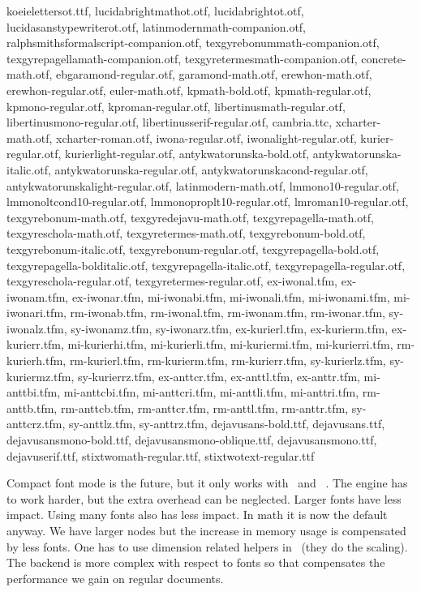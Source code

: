 \switchtobodyfont[tt,8pt]
koeielettersot.ttf, lucidabrightmathot.otf, lucidabrightot.otf,
lucidasanstypewriterot.otf, latinmodernmath-companion.otf,
ralphsmithsformalscript-companion.otf, texgyrebonummath-companion.otf,
texgyrepagellamath-companion.otf, texgyretermesmath-companion.otf,
concrete-math.otf, ebgaramond-regular.otf, garamond-math.otf, erewhon-math.otf,
erewhon-regular.otf, euler-math.otf, kpmath-bold.otf, kpmath-regular.otf,
kpmono-regular.otf, kproman-regular.otf, libertinusmath-regular.otf,
libertinusmono-regular.otf, libertinusserif-regular.otf, cambria.ttc,
xcharter-math.otf, xcharter-roman.otf, iwona-regular.otf, iwonalight-regular.otf,
kurier-regular.otf, kurierlight-regular.otf, antykwatorunska-bold.otf,
antykwatorunska-italic.otf, antykwatorunska-regular.otf,
antykwatorunskacond-regular.otf, antykwatorunskalight-regular.otf,
latinmodern-math.otf, lmmono10-regular.otf, lmmonoltcond10-regular.otf,
lmmonoproplt10-regular.otf, lmroman10-regular.otf, texgyrebonum-math.otf,
texgyredejavu-math.otf, texgyrepagella-math.otf, texgyreschola-math.otf,
texgyretermes-math.otf, texgyrebonum-bold.otf, texgyrebonum-italic.otf,
texgyrebonum-regular.otf, texgyrepagella-bold.otf, texgyrepagella-bolditalic.otf,
texgyrepagella-italic.otf, texgyrepagella-regular.otf, texgyreschola-regular.otf,
texgyretermes-regular.otf, ex-iwonal.tfm, ex-iwonam.tfm, ex-iwonar.tfm,
mi-iwonabi.tfm, mi-iwonali.tfm, mi-iwonami.tfm, mi-iwonari.tfm, rm-iwonab.tfm,
rm-iwonal.tfm, rm-iwonam.tfm, rm-iwonar.tfm, sy-iwonalz.tfm, sy-iwonamz.tfm,
sy-iwonarz.tfm, ex-kurierl.tfm, ex-kurierm.tfm, ex-kurierr.tfm, mi-kurierhi.tfm,
mi-kurierli.tfm, mi-kuriermi.tfm, mi-kurierri.tfm, rm-kurierh.tfm,
rm-kurierl.tfm, rm-kurierm.tfm, rm-kurierr.tfm, sy-kurierlz.tfm, sy-kuriermz.tfm,
sy-kurierrz.tfm, ex-anttcr.tfm, ex-anttl.tfm, ex-anttr.tfm, mi-anttbi.tfm,
mi-anttcbi.tfm, mi-anttcri.tfm, mi-anttli.tfm, mi-anttri.tfm, rm-anttb.tfm,
rm-anttcb.tfm, rm-anttcr.tfm, rm-anttl.tfm, rm-anttr.tfm, sy-anttcrz.tfm,
sy-anttlz.tfm, sy-anttrz.tfm, dejavusans-bold.ttf, dejavusans.ttf,
dejavusansmono-bold.ttf, dejavusansmono-oblique.ttf, dejavusansmono.ttf,
dejavuserif.ttf, stixtwomath-regular.ttf, stixtwotext-regular.ttf \stopalign

\stoptitle

\starttitle[title=Summary]

\startitemize
    \startitem
        Compact font mode is the future, but it only works with \LUAMETATEX\ and
        \CONTEXT\ \LMTX.
    \stopitem
    \startitem
        The engine has to work harder, but the extra overhead can be neglected.
    \stopitem
    \startitem
        Larger fonts have less impact.
    \stopitem
    \startitem
        Using many fonts also has less impact.
    \stopitem
    \startitem
        In math it is now the default anyway.
    \stopitem
    \startitem
        We have larger nodes but the increase in memory usage is compensated by less fonts.
    \stopitem
    \startitem
        One has to use dimension related helpers in \LUA\ (they do the scaling).
    \stopitem
    \startitem
        The backend is more complex with respect to fonts so that compensates
        the performance we gain on regular documents.
    \stopitem
\stopitemize

\stoptitle

\stopdocument


